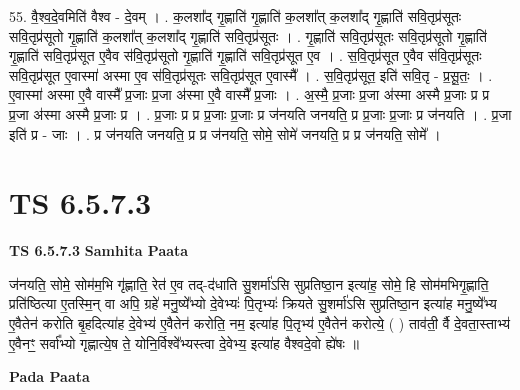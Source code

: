 \documentclass[17pt]{extarticle}
\begin{document}
55. वै॒श्व॒दे॒वमिति॑ वैश्व - दे॒वम् । . क॒लशा᳚द् गृ॒ह्णाति॑ गृ॒ह्णाति॑ क॒लशा᳚त् क॒लशा᳚द् गृ॒ह्णाति॑ सवि॒तृप्र॑सूतः सवि॒तृप्र॑सूतो गृ॒ह्णाति॑ क॒लशा᳚त् क॒लशा᳚द् गृ॒ह्णाति॑ सवि॒तृप्र॑सूतः । . गृ॒ह्णाति॑ सवि॒तृप्र॑सूतः सवि॒तृप्र॑सूतो गृ॒ह्णाति॑ गृ॒ह्णाति॑ सवि॒तृप्र॑सूत ए॒वैव स॑वि॒तृप्र॑सूतो गृ॒ह्णाति॑ गृ॒ह्णाति॑ सवि॒तृप्र॑सूत ए॒व । . स॒वि॒तृप्र॑सूत ए॒वैव स॑वि॒तृप्र॑सूतः सवि॒तृप्र॑सूत ए॒वास्मा॑ अस्मा ए॒व स॑वि॒तृप्र॑सूतः सवि॒तृप्र॑सूत ए॒वास्मै᳚ । . स॒वि॒तृप्र॑सूत॒ इति॑ सवि॒तृ - प्र॒सू॒तः॒ । . ए॒वास्मा॑ अस्मा ए॒वै वास्मै᳚ प्र॒जाः प्र॒जा अ॑स्मा ए॒वै वास्मै᳚ प्र॒जाः । . अ॒स्मै॒ प्र॒जाः प्र॒जा अ॑स्मा अस्मै प्र॒जाः प्र प्र प्र॒जा अ॑स्मा अस्मै प्र॒जाः प्र । . प्र॒जाः प्र प्र प्र॒जाः प्र॒जाः प्र ज॑नयति जनयति॒ प्र प्र॒जाः प्र॒जाः प्र ज॑नयति । . प्र॒जा इति॑ प्र - जाः । . प्र ज॑नयति जनयति॒ प्र प्र ज॑नयति॒ सोमे॒ सोमे॑ जनयति॒ प्र प्र ज॑नयति॒ सोमे᳚ । \newline
\pagebreak
{}

\section{ TS 6.5.7.3 }

\textbf{TS 6.5.7.3 } \newline
\textbf{Samhita Paata} \newline

ज॑नयति॒ सोमे॒ सोम॑म॒भि गृ॑ह्णाति॒ रेत॑ ए॒व तद्-द॑धाति सु॒शर्मा॑ऽसि सुप्रतिष्ठा॒न इत्या॑ह॒ सोमे॒ हि सोम॑मभिगृ॒ह्णाति॒ प्रति॑ष्ठित्या ए॒तस्मि॒न् वा अपि॒ ग्रहे॑ मनु॒ष्ये᳚भ्यो दे॒वेभ्यः॑ पि॒तृभ्यः॑ क्रियते सु॒शर्मा॑ऽसि सुप्रतिष्ठा॒न इत्या॑ह मनु॒ष्ये᳚भ्य ए॒वैतेन॑ करोति बृ॒हदित्या॑ह दे॒वेभ्य॑ ए॒वैतेन॑ करोति॒ नम॒ इत्या॑ह पि॒तृभ्य॑ ए॒वैतेन॑ करोत्ये॒ ( ) ताव॑ती॒ र्वै दे॒वता॒स्ताभ्य॑ ए॒वैनꣳ॒॒ सर्वा᳚भ्यो गृह्णात्ये॒ष ते॒ योनि॒र्विश्वे᳚भ्यस्त्वा दे॒वेभ्य॒ इत्या॑ह वैश्वदे॒वो ह्ये॑षः ॥ \newline

\textbf{Pada Paata} \newline
\end{document}

